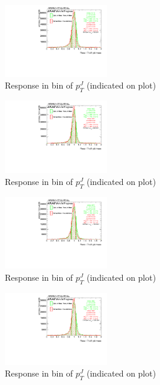 \begin{figure}

\includegraphics[width=0.4\textwidth]{appendixB/mTASCOMB_Tops_calibmCal_030ro_20:20:52-03-11-2016/8ResponsePTJ_h_JetRatio_mJ03CALO.pdf}
\caption{Response in bin of  $p_{T}^{J}$ (indicated on plot)} 

\end{figure}

\begin{figure}

\includegraphics[width=0.4\textwidth]{appendixB/mTASCOMB_Tops_calibmCal_030ro_20:20:52-03-11-2016/8ResponsePTJ_h_JetRatio_mJ04CALO.pdf}
\caption{Response in bin of  $p_{T}^{J}$ (indicated on plot)} 

\end{figure}

\begin{figure}

\includegraphics[width=0.4\textwidth]{appendixB/mTASCOMB_Tops_calibmCal_030ro_20:20:52-03-11-2016/8ResponsePTJ_h_JetRatio_mJ05CALO.pdf}
\caption{Response in bin of  $p_{T}^{J}$ (indicated on plot)} 

\end{figure}

\begin{figure}

\includegraphics[width=0.4\textwidth]{appendixB/mTASCOMB_Tops_calibmCal_030ro_20:20:52-03-11-2016/8ResponsePTJ_h_JetRatio_mJ06CALO.pdf}
\caption{Response in bin of  $p_{T}^{J}$ (indicated on plot)} 

\end{figure}

